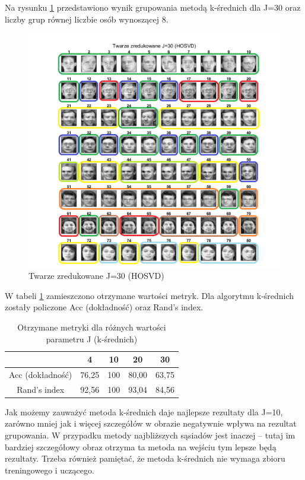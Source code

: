 \documentclass[11pt, a4paper]{article}
\newcommand{\fbi}{\leavevmode{\parindent=1em\indent}}
\begin{document}
\newpage
Na rysunku \ref{fig:rezultat_HOSVD_j30} przedstawiono wynik grupowania metodą k-średnich dla J=30 oraz liczby grup równej liczbie osób wynoszącej 8.

\begin{figure}[H]
	\centering
	\includegraphics[width=1\textwidth]{./assets/rezultat_HOSVD_j30.png}
	\caption{Twarze zredukowane J=30 (HOSVD)}
	\label{fig:rezultat_HOSVD_j30}
\end{figure}

\fbi
W tabeli \ref{tab:wynikiKmeans} zamieszczono otrzymane wartości metryk. Dla algorytmu k-średnich zostały policzone Acc (dokładność) oraz Rand's index.

\begin{table}[H]
	\centering
	\caption{Otrzymane metryki dla różnych wartości parametru J (k-średnich)}
	\begin{tabular}{|c|c|c|c|c|}
		\hline 
		 & 4 & 10 & 20 & 30 \\ 
		\hline
		Acc (dokładność) & 76,25 & 100 & 80,00 & 63,75 \\
		\hline
		Rand's index & 92,56 & 100 & 93,04 & 84,56 \\
		\hline
	\end{tabular}
	\label{tab:wynikiKmeans}
\end{table}

\fbi
Jak możemy zauważyć metoda k-średnich daje najlepsze rezultaty dla J=10, zarówno mniej jak i więcej szczegółów w obrazie negatywnie wpływa na rezultat grupowania. W przypadku metody najbliższych sąsiadów jest inaczej -- tutaj im bardziej szczegółowy obraz otrzyma ta metoda na wejściu tym lepsze będą rezultaty. Trzeba również pamiętać, że metoda k-średnich nie wymaga zbioru treningowego i uczącego.
\end{document}
